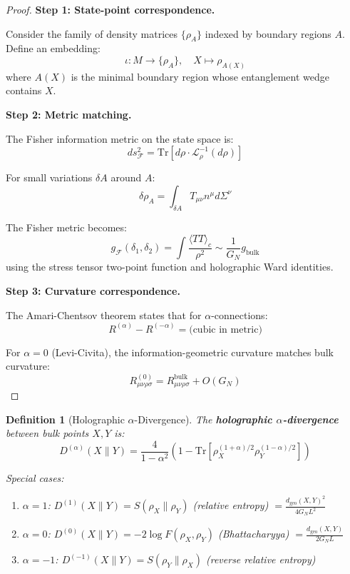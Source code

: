 \documentclass[12pt,a4paper]{article}
\newtheorem{definition}[theorem]{Definition}
\begin{document}
\begin{proof}
\textbf{Step 1: State-point correspondence.}

Consider the family of density matrices $\{\rho_A\}$ indexed by boundary regions $A$. Define an embedding:
\begin{equation}
\iota: M \to \{\rho_A\}, \quad X \mapsto \rho_{A(X)}
\end{equation}
where $A(X)$ is the minimal boundary region whose entanglement wedge contains $X$.

\textbf{Step 2: Metric matching.}

The Fisher information metric on the state space is:
\begin{equation}
ds_{\mathcal{F}}^2 = \text{Tr}[d\rho \cdot \mathcal{L}_\rho^{-1}(d\rho)]
\end{equation}

For small variations $\delta A$ around $A$:
\begin{equation}
\delta \rho_A = \int_{\delta A} T_{\mu\nu} n^\mu d\Sigma^\nu
\end{equation}

The Fisher metric becomes:
\begin{equation}
g_{\mathcal{F}}(\delta_1, \delta_2) = \int \frac{\langle T T \rangle_c}{\rho^2} \sim \frac{1}{G_N} g_{\text{bulk}}
\end{equation}
using the stress tensor two-point function and holographic Ward identities.

\textbf{Step 3: Curvature correspondence.}

The Amari-Chentsov theorem states that for $\alpha$-connections:
\begin{equation}
R^{(\alpha)} - R^{(-\alpha)} = \text{(cubic in metric)}
\end{equation}

For $\alpha = 0$ (Levi-Civita), the information-geometric curvature matches bulk curvature:
\begin{equation}
R^{(0)}_{\mu\nu\rho\sigma} = R^{\text{bulk}}_{\mu\nu\rho\sigma} + O(G_N)
\end{equation}
\end{proof}

\begin{definition}[Holographic $\alpha$-Divergence]\label{def:holo-alpha-div}
The \textbf{holographic $\alpha$-divergence} between bulk points $X, Y$ is:
\begin{equation}
D^{(\alpha)}(X \| Y) = \frac{4}{1-\alpha^2} \left( 1 - \text{Tr}[\rho_X^{(1+\alpha)/2} \rho_Y^{(1-\alpha)/2}] \right)
\end{equation}

Special cases:
\begin{enumerate}
    \item $\alpha = 1$: $D^{(1)}(X\|Y) = S(\rho_X \| \rho_Y)$ (relative entropy) $= \frac{d_{\text{geo}}(X,Y)^2}{4G_N L^2}$
    \item $\alpha = 0$: $D^{(0)}(X\|Y) = -2\log F(\rho_X, \rho_Y)$ (Bhattacharyya) $= \frac{d_{\text{geo}}(X,Y)}{2G_N L}$
    \item $\alpha = -1$: $D^{(-1)}(X\|Y) = S(\rho_Y \| \rho_X)$ (reverse relative entropy)
\end{enumerate}
\end{definition}
\end{document}
